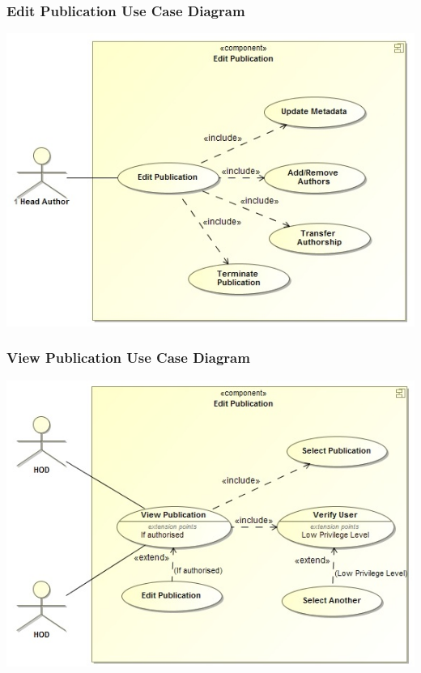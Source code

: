 \documentclass[a4paper,12pt]{article}
\begin{document}
	\subsubsection{Edit Publication Use Case Diagram}
	\includegraphics[width=1\textwidth]{./EditPublication.jpg}\\[1.5cm]

	\subsubsection{View Publication Use Case Diagram}
	\includegraphics[width=1\textwidth]{./ViewPublication.jpg}\\[1.5cm]
	
\end{document}
